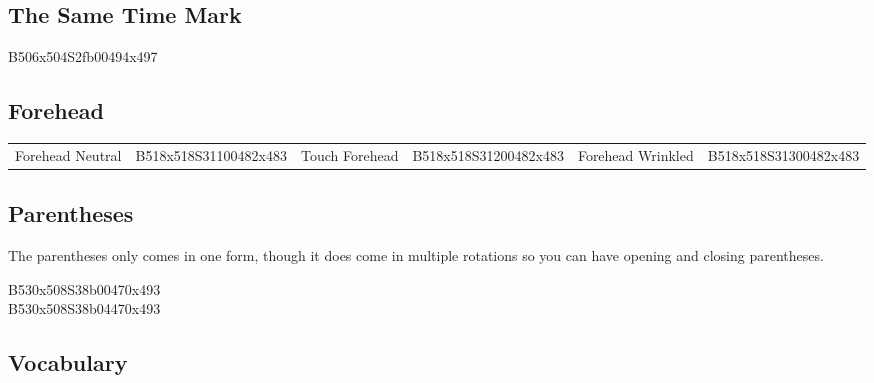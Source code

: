 \documentclass{article}
\begin{document}
\subsection{The Same Time Mark}

\begin{center}
B506x504S2fb00494x497
\end{center}

\subsection{Forehead}

\begin{center}
\begin{tabular}{*{6}{c}}
Forehead Neutral&B518x518S31100482x483&Touch Forehead&B518x518S31200482x483&Forehead Wrinkled&B518x518S31300482x483\\
\end{tabular}
\end{center}

\subsection{Parentheses}

The parentheses only comes in one form, though it does come in multiple rotations so you can have opening and closing parentheses.

\begin{center}
B530x508S38b00470x493\\
B530x508S38b04470x493\\
\end{center}

\subsection{Vocabulary}
\end{document}
